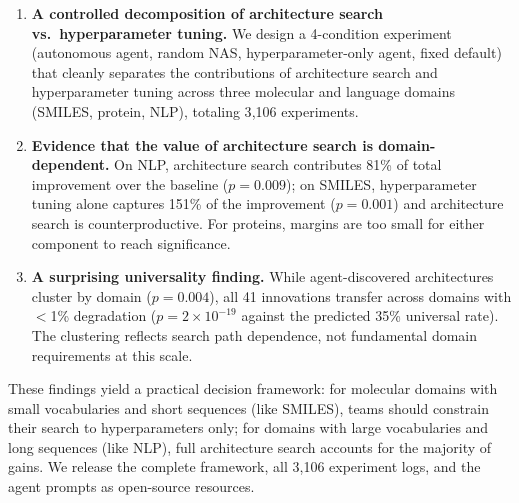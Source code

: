 \begin{enumerate}[nosep]
\item \textbf{A controlled decomposition of architecture search vs.\ hyperparameter tuning.} We design a 4-condition experiment (autonomous agent, random NAS, hyperparameter-only agent, fixed default) that cleanly separates the contributions of architecture search and hyperparameter tuning across three molecular and language domains (SMILES, protein, NLP), totaling 3{,}106 experiments.

\item \textbf{Evidence that the value of architecture search is domain-dependent.} On NLP, architecture search contributes 81\% of total improvement over the baseline ($p = 0.009$); on SMILES, hyperparameter tuning alone captures 151\% of the improvement ($p = 0.001$) and architecture search is counterproductive. For proteins, margins are too small for either component to reach significance.

\item \textbf{A surprising universality finding.} While agent-discovered architectures cluster by domain ($p = 0.004$), all 41 innovations transfer across domains with $<$1\% degradation ($p = 2 \times 10^{-19}$ against the predicted 35\% universal rate). The clustering reflects search path dependence, not fundamental domain requirements at this scale.
\end{enumerate}

These findings yield a practical decision framework: for molecular domains with small vocabularies and short sequences (like SMILES), teams should constrain their search to hyperparameters only; for domains with large vocabularies and long sequences (like NLP), full architecture search accounts for the majority of gains. We release the complete framework, all 3{,}106 experiment logs, and the agent prompts as open-source resources.
